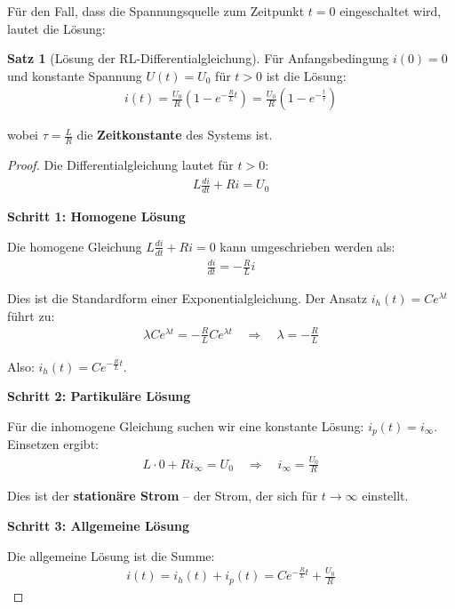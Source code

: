 ﻿\documentclass[a4paper,12pt]{report}
\theoremstyle{definition}
\newtheorem{satz}{Satz}
\begin{document}
	Für den Fall, dass die Spannungsquelle zum Zeitpunkt $t = 0$ eingeschaltet wird, lautet die Lösung:
	
	\begin{satz}[Lösung der RL-Differentialgleichung]
		Für Anfangsbedingung $i(0) = 0$ und konstante Spannung $U(t) = U_0$ für $t > 0$ ist die Lösung:
		\begin{align}
			i(t) = \frac{U_0}{R} \left(1 - e^{-\frac{R}{L}t}\right) = \frac{U_0}{R} \left(1 - e^{-\frac{t}{\tau}}\right)
		\end{align}
		
		wobei $\tau = \frac{L}{R}$ die \textbf{Zeitkonstante} des Systems ist.
	\end{satz}
	
	\begin{proof}
		Die Differentialgleichung lautet für $t > 0$:
		\begin{align}
			L \frac{di}{dt} + R i = U_0
		\end{align}
		
		\textbf{Schritt 1: Homogene Lösung}
		
		Die homogene Gleichung $L \frac{di}{dt} + R i = 0$ kann umgeschrieben werden als:
		\begin{align}
			\frac{di}{dt} = -\frac{R}{L} i
		\end{align}
		
		Dies ist die Standardform einer Exponentialgleichung. Der Ansatz $i_h(t) = C e^{\lambda t}$ führt zu:
		\begin{align}
			\lambda C e^{\lambda t} = -\frac{R}{L} C e^{\lambda t} \quad \Rightarrow \quad \lambda = -\frac{R}{L}
		\end{align}
		
		Also: $i_h(t) = C e^{-\frac{R}{L}t}$.
		
		\textbf{Schritt 2: Partikuläre Lösung}
		
		Für die inhomogene Gleichung suchen wir eine konstante Lösung: $i_p(t) = i_{\infty}$.
		Einsetzen ergibt:
		\begin{align}
			L \cdot 0 + R i_{\infty} = U_0 \quad \Rightarrow \quad i_{\infty} = \frac{U_0}{R}
		\end{align}
		
		Dies ist der \textbf{stationäre Strom} -- der Strom, der sich für $t \to \infty$ einstellt.
		
		\textbf{Schritt 3: Allgemeine Lösung}
		
		Die allgemeine Lösung ist die Summe:
		\begin{align}
			i(t) = i_h(t) + i_p(t) = C e^{-\frac{R}{L}t} + \frac{U_0}{R}
		\end{align}
		

\end{proof}
\end{document}

